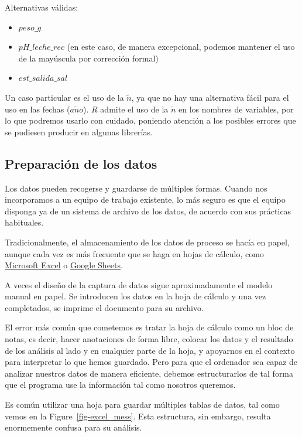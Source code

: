 \documentclass[
  letterpaper,
]{scrbook}
\providecommand{\tightlist}{%
  \setlength{\itemsep}{0pt}\setlength{\parskip}{0pt}}\usepackage{longtable,booktabs,array}
\begin{document}
Alternativas válidas:

\begin{itemize}
\tightlist
\item
  \(peso\_g\)
\item
  \(pH\_leche\_rec\) (en este caso, de manera excepcional, podemos
  mantener el uso de la mayúscula por corrección formal)
\item
  \(est\_salida\_sal\)
\end{itemize}

Un caso particular es el uso de la \(\tilde{n}\), ya que no hay una
alternativa fácil para el uso en las fechas (\(a\tilde{n}o\)). \(R\)
admite el uso de la \(\tilde{n}\) en los nombres de variables, por lo
que podremos usarlo con cuidado, poniendo atención a los posibles
errores que se pudiesen producir en algunas librerías.

\hypertarget{preparaciuxf3n-de-los-datos}{%
\subsection{Preparación de los
datos}\label{preparaciuxf3n-de-los-datos}}

Los datos pueden recogerse y guardarse de múltiples formas. Cuando nos
incorporamos a un equipo de trabajo existente, lo más seguro es que el
equipo disponga ya de un sistema de archivo de los datos, de acuerdo con
sus prácticas habituales.

Tradicionalmente, el almacenamiento de los datos de proceso se hacía en
papel, aunque cada vez es más frecuente que se haga en hojas de cálculo,
como
\href{https://www.microsoft.com/es-es/microsoft-365/excel}{Microsoft
Excel} o \href{https://www.google.es/intl/es/sheets/about/}{Google
Sheets}.

A veces el diseño de la captura de datos sigue aproximadamente el modelo
manual en papel. Se introducen los datos en la hoja de cálculo y una vez
completados, se imprime el documento para su archivo.

El error más común que cometemos es tratar la hoja de cálculo como un
bloc de notas, es decir, hacer anotaciones de forma libre, colocar los
datos y el resultado de los análisis al lado y en cualquier parte de la
hoja, y apoyarnos en el contexto para interpretar lo que hemos guardado.
Pero para que el ordenador sea capaz de analizar nuestros datos de
manera eficiente, debemos estructurarlos de tal forma que el programa
use la información tal como nosotros queremos.

Es común utilizar una hoja para guardar múltiples tablas de datos, tal
como vemos en la Figure~\ref{fig-excel_mess}. Esta estructura, sin
embargo, resulta enormemente confusa para su análisis.
\end{document}
